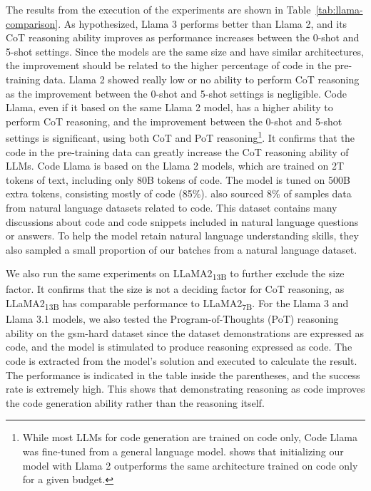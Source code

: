 The results from the execution of the experiments are shown in Table~\ref{tab:llama-comparison}.
As hypothesized, Llama 3 performs better than Llama 2, and its CoT reasoning ability improves as performance increases between the 0-shot and 5-shot settings.
Since the models are the same size and have similar architectures, the improvement should be related to the higher percentage of code in the pre-training data.
Llama 2 showed really low or no ability to perform CoT reasoning as the improvement between the 0-shot and 5-shot settings is negligible.
Code Llama\cite{roziere2024codellamaopenfoundation}, even if it based on the same Llama 2 model, has a higher ability to perform CoT reasoning, and the improvement between the 0-shot and 5-shot settings is significant, using both CoT and PoT reasoning\footnote{While most LLMs for code generation are trained on code only, Code Llama was fine-tuned from a general language model. \textcite{roziere2024codellamaopenfoundation} shows that initializing our model with Llama 2 outperforms the same architecture trained on code only for a given budget.}.
It confirms that the code in the pre-training data can greatly increase the CoT reasoning ability of LLMs.
Code Llama is based on the Llama 2 models, which are trained on 2T tokens of text, including only 80B tokens of code.
The model is tuned on 500B extra tokens, consisting mostly of code (85\%).
\textcite{roziere2024codellamaopenfoundation} also sourced 8\% of samples data from natural language datasets related to code.
This dataset contains many discussions about code and code snippets included in natural language questions or answers.
To help the model retain natural language understanding skills, they also sampled a small proportion of our batches from a natural language dataset.

We also run the same experiments on LLaMA2\textsubscript{13B} to further exclude the size factor.
It confirms that the size is not a deciding factor for CoT reasoning, as LLaMA2\textsubscript{13B} has comparable performance to LLaMA2\textsubscript{7B}.
For the Llama 3 and Llama 3.1 models, we also tested the Program-of-Thoughts (PoT) reasoning ability on the gsm-hard dataset since the dataset demonstrations are expressed as code, and the model is stimulated to produce reasoning expressed as code.
The code is extracted from the model's solution and executed to calculate the result.
The performance is indicated in the table inside the parentheses, and the success rate is extremely high.
This shows that demonstrating reasoning as code improves the code generation ability rather than the reasoning itself.

